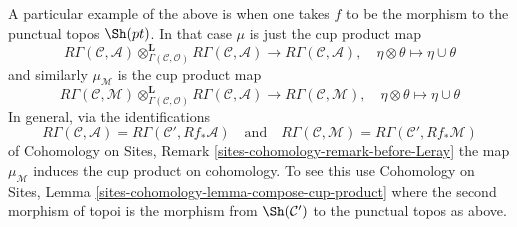 \medskip\noindent
A particular example of the above is when one takes $f$ to be the morphism
to the punctual topos $\Sh(pt)$. In that case $\mu$ is just the cup product
map
$$
R\Gamma(\mathcal{C}, \mathcal{A})
\otimes_{\Gamma(\mathcal{C}, \mathcal{O})}^\mathbf{L}
R\Gamma(\mathcal{C}, \mathcal{A})
\longrightarrow
R\Gamma(\mathcal{C}, \mathcal{A}),
\quad \eta \otimes \theta \mapsto \eta \cup \theta
$$
and similarly $\mu_\mathcal{M}$ is the cup product map
$$
R\Gamma(\mathcal{C}, \mathcal{M})
\otimes_{\Gamma(\mathcal{C}, \mathcal{O})}^\mathbf{L}
R\Gamma(\mathcal{C}, \mathcal{A})
\longrightarrow
R\Gamma(\mathcal{C}, \mathcal{M}),
\quad \eta \otimes \theta \mapsto \eta \cup \theta
$$
In general, via the identifications
$$
R\Gamma(\mathcal{C}, \mathcal{A}) =
R\Gamma(\mathcal{C}', Rf_*\mathcal{A})
\quad\text{and}\quad
R\Gamma(\mathcal{C}, \mathcal{M}) =
R\Gamma(\mathcal{C}', Rf_*\mathcal{M})
$$
of Cohomology on Sites, Remark \ref{sites-cohomology-remark-before-Leray}
the map $\mu_\mathcal{M}$ induces the cup product on cohomology.
To see this use
Cohomology on Sites, Lemma \ref{sites-cohomology-lemma-compose-cup-product}
where the second morphism of topoi is the morphism from $\Sh(\mathcal{C}')$
to the punctual topos as above.

